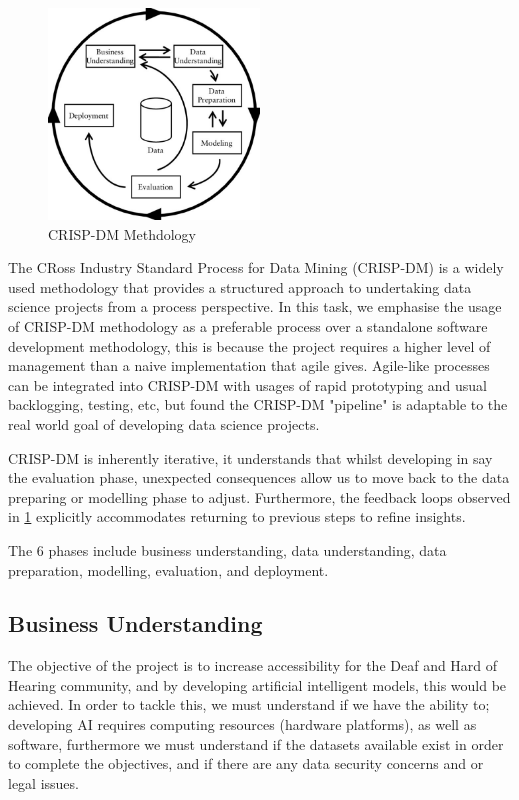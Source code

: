 \documentclass[preprint,11pt,review,authoryear]{elsarticle}
\begin{document}
\begin{figure}[h]
    \centering
    \includegraphics[width=0.5\textwidth]{images/CRISP-DM-process-model_W640.jpg}
    \caption{CRISP-DM Methdology \cite{lofstromUtilizingDiversityPerformance2009}}
    \label{fig:CRISP-DM Methdology}
\end{figure}

The CRoss Industry Standard Process for Data Mining (CRISP-DM) is a widely used methodology that provides a structured approach to undertaking data science projects from a process perspective. In this task, we emphasise the usage of CRISP-DM methodology as a preferable process over a standalone software development methodology, this is because the project requires a higher level of management than a naive implementation that agile gives. Agile-like processes can be integrated into CRISP-DM with usages of rapid prototyping and usual backlogging, testing, etc, but found the CRISP-DM "pipeline" is adaptable to the real world goal of developing data science projects.

CRISP-DM is inherently iterative, it understands that whilst developing in say the evaluation phase, unexpected consequences allow us to move back to the data preparing or modelling phase to adjust. Furthermore, the feedback loops observed in \ref{fig:CRISP-DM Methdology} explicitly accommodates returning to previous steps to refine insights. 

The 6 phases include business understanding, data understanding, data preparation, modelling, evaluation, and deployment.

\subsection{Business Understanding}

The objective of the project is to increase accessibility for the Deaf and Hard of Hearing community, and by developing artificial intelligent models, this would be achieved. In order to tackle this, we must understand if we have the ability to; developing AI requires computing resources (hardware platforms), as well as software, furthermore we must understand if the datasets available exist in order to complete the objectives, and if there are any data security concerns and or legal issues.
\end{document}
